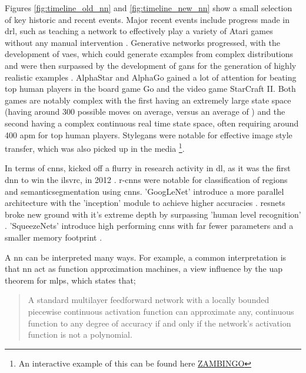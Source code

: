 Figures \ref{fig:timeline_old_nn} and \ref{fig:timeline_new_nn} show a small selection of key historic and recent events. Major recent events include progress made in \gls{drl}, such as teaching a network to effectively play a variety of Atari games without any manual intervention \cite{drl_atari}. Generative networks progressed, with the development of \gls{vae}s, which could generate examples from complex distributions and were then surpassed by the development of \gls{gan}s for the generation of highly realistic examples \cite{gan}. AlphaStar  \cite{alpha_star} and AlphaGo \cite{alpha_go} gained a lot of attention \cite{press_alpha_go} \cite{press_alpha_star} for beating top human players in the board game Go and the video game StarCraft II. Both games are notably complex with the first having an extremely large state space (having around 300 possible moves on average, versus an average of \cite{moves_chess_go}) and the second having a complex continuous real time state space, often requiring  around 400 \gls{apm} \cite{sc_apm} for top human players. Style\gls{gan}s were notable for effective image style transfer, which was also picked up in the media \cite{press_stylegan} \footnote{An interactive example of this can be found here \url{ZAMBINGO}}.

In terms of \gls{cnn}s, kicked off a flurry in research activity in \gls{dl}, as it was the first \gls{dnn} to win the \gls{ilsvrc}, in 2012 \cite{alex_net}. \gls{r-cnn}s were notable for classification of regions and \gls{semanticsegmentation} using \gls{cnn}s. 'GoogLeNet' introduce a more parallel architecture with the 'inception' module to achieve higher accuracies \cite{googlenet}. \gls{resnet}s broke new ground with it's extreme depth \cite{resnet} by surpassing 'human level recognition' \cite{resnet_human}. 'SqueezeNets' introduce high performing \gls{cnn}s with far fewer parameters and a smaller memory footprint \cite{squeeze_net}. 
\bigskip

A \gls{nn} can be interpreted many ways. For example, a common interpretation is that \gls{nn} act as function approximation machines, a view influence by the \gls{uap} theorem for \gls{mlp}s, which states that;

\begin{quote}
    A standard multilayer feedforward network with a locally bounded piecewise continuous activation function can approximate any, continuous function to any degree of accuracy if and only if the network's activation function is not a polynomial.\cite{uap_mlp}
\end{quote}

